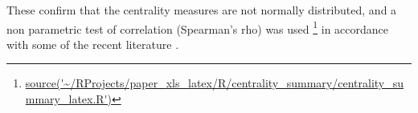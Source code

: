 These confirm that the centrality measures are not normally distributed, and a non parametric test of correlation (Spearman's rho) was used \footnote{\url{source('~/RProjects/paper_xls_latex/R/centrality_summary/centrality_summary_latex.R')}} in accordance with some of the recent literature \cite{oldham2019consistency}.







